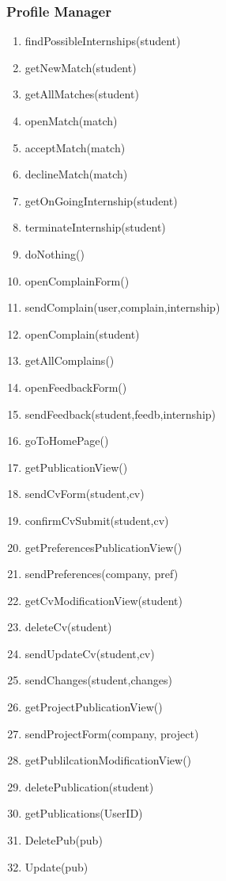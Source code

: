 \documentclass{article}
\begin{document}
\subsubsection{Profile Manager}
\begin{enumerate}
    \item findPossibleInternships(student)
    \item getNewMatch(student)
    \item getAllMatches(student)
    \item openMatch(match)
    \item acceptMatch(match)
    \item declineMatch(match)
    \item getOnGoingInternship(student)
    \item terminateInternship(student)
    \item doNothing()
    \item openComplainForm()
    \item sendComplain(user,complain,internship)
    \item openComplain(student)
    \item getAllComplains()
    \item openFeedbackForm()
    \item sendFeedback(student,feedb,internship)
    \item goToHomePage()
    \item getPublicationView()
    \item sendCvForm(student,cv)
    \item confirmCvSubmit(student,cv)
    \item getPreferencesPublicationView()
    \item sendPreferences(company, pref)
    \item getCvModificationView(student)
    \item deleteCv(student)
    \item sendUpdateCv(student,cv)
    \item sendChanges(student,changes)
    \item getProjectPublicationView()
    \item sendProjectForm(company, project)
    \item getPublilcationModificationView()
    \item deletePublication(student)
    \item getPublications(UserID)
    \item DeletePub(pub)
    \item Update(pub)

\end{enumerate}
\end{document}
